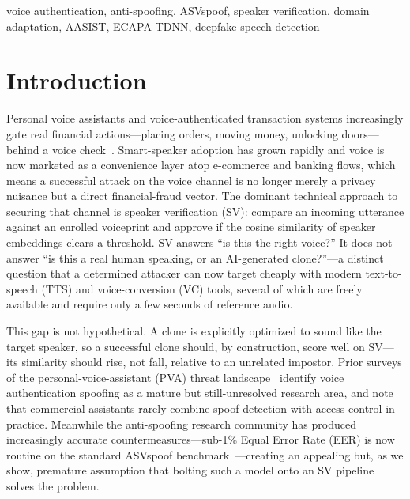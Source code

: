 \documentclass[conference]{IEEEtran}
\begin{document}
\begin{IEEEkeywords}
voice authentication, anti-spoofing, ASVspoof, speaker verification, domain
adaptation, AASIST, ECAPA-TDNN, deepfake speech detection
\end{IEEEkeywords}

\section{Introduction}

Personal voice assistants and voice-authenticated transaction systems
increasingly gate real financial actions---placing orders, moving money,
unlocking doors---behind a voice check~\cite{cheng2022survey}. Smart-speaker
adoption has grown rapidly and voice is now marketed as a convenience layer
atop e-commerce and banking flows, which means a successful attack on the voice
channel is no longer merely a privacy nuisance but a direct financial-fraud
vector. The dominant technical approach to securing that channel is speaker
verification (SV): compare an incoming utterance against an enrolled voiceprint
and approve if the cosine similarity of speaker embeddings clears a threshold.
SV answers ``is this the right voice?'' It does not answer ``is this a real
human speaking, or an AI-generated clone?''---a distinct question that a
determined attacker can now target cheaply with modern text-to-speech (TTS) and
voice-conversion (VC) tools, several of which are freely available and require
only a few seconds of reference audio.

This gap is not hypothetical. A clone is explicitly optimized to sound like the
target speaker, so a successful clone should, by construction, score well on
SV---its similarity should rise, not fall, relative to an unrelated impostor.
Prior surveys of the personal-voice-assistant (PVA) threat
landscape~\cite{cheng2022survey} identify voice authentication spoofing as a
mature but still-unresolved research area, and note that commercial assistants
rarely combine spoof detection with access control in practice. Meanwhile the
anti-spoofing research community has produced increasingly accurate
countermeasures---sub-1\% Equal Error Rate (EER) is now routine on the standard
ASVspoof benchmark~\cite{jung2022aasist}---creating an appealing but, as we
show, premature assumption that bolting such a model onto an SV pipeline solves
the problem.
\end{document}
